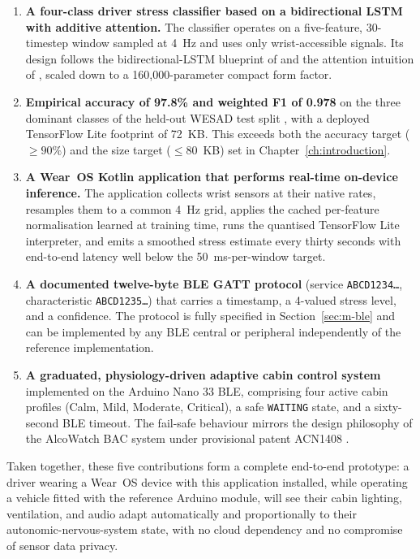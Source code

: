 \begin{enumerate}
  \item \textbf{A four-class driver stress classifier based on a
  bidirectional LSTM with additive attention.} The classifier
  operates on a five-feature, 30-timestep window sampled at 4~Hz
  and uses only wrist-accessible signals. Its design follows the
  bidirectional-LSTM blueprint of \citet{graves2005bilstm} and the
  attention intuition of \citet{vaswani2017attention}, scaled down
  to a 160{,}000-parameter compact form factor.

  \item \textbf{Empirical accuracy of 97.8\% and weighted F1 of 0.978}
  on the three dominant classes of the held-out WESAD test split
  \citep{schmidt2018wesad}, with a deployed TensorFlow Lite
  \citep{tflite2023} footprint of 72~KB. This exceeds both the accuracy
  target ($\ge 90\%$) and the size target ($\le 80$~KB) set in
  Chapter~\ref{ch:introduction}.

  \item \textbf{A Wear~OS Kotlin application that performs real-time
  on-device inference.} The application collects wrist sensors at
  their native rates, resamples them to a common 4~Hz grid, applies
  the cached per-feature normalisation learned at training time,
  runs the quantised TensorFlow Lite interpreter, and emits a
  smoothed stress estimate every thirty seconds with end-to-end
  latency well below the 50~ms-per-window target.

  \item \textbf{A documented twelve-byte BLE GATT protocol}
  (service \texttt{ABCD1234\ldots}, characteristic
  \texttt{ABCD1235\ldots}) that carries a timestamp, a 4-valued
  stress level, and a confidence. The protocol is fully specified
  in Section~\ref{sec:m-ble} and can be implemented by any BLE
  central or peripheral independently of the reference
  implementation.

  \item \textbf{A graduated, physiology-driven adaptive cabin
  control system} implemented on the Arduino Nano 33 BLE, comprising
  four active cabin profiles (Calm, Mild, Moderate, Critical), a
  safe \texttt{WAITING} state, and a sixty-second BLE timeout.
  The fail-safe behaviour mirrors the design philosophy of the
  AlcoWatch BAC system under provisional patent ACN1408
  \citep{acn1408}.
\end{enumerate}

Taken together, these five contributions form a complete
end-to-end prototype: a driver wearing a Wear~OS device with this
application installed, while operating a vehicle fitted with the
reference Arduino module, will see their cabin lighting, ventilation,
and audio adapt automatically and proportionally to their
autonomic-nervous-system state, with no cloud dependency and no
compromise of sensor data privacy.

